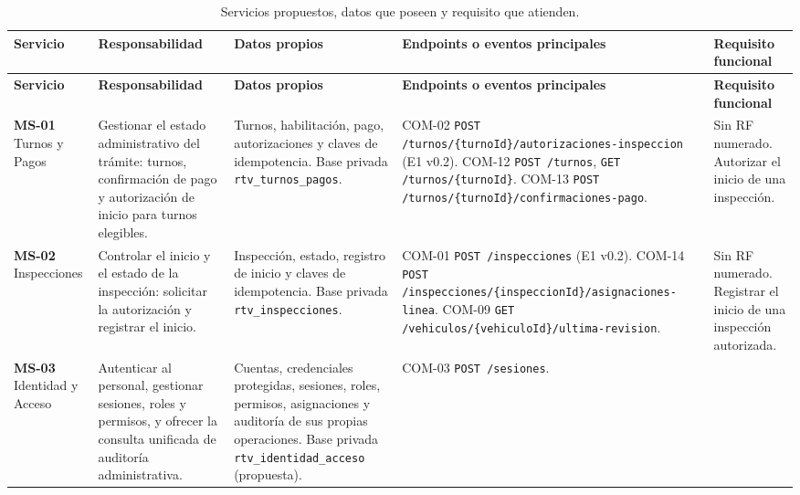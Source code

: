 \documentclass[11pt,a4paper]{article}
\begin{document}
\begingroup
\footnotesize
\renewcommand{\arraystretch}{1.05}
\begin{longtable}{@{}p{1.9cm}p{3.3cm}p{4.1cm}p{3.1cm}p{2.1cm}@{}}
\caption{Servicios propuestos, datos que poseen y requisito que atienden.}\label{tab:servicios}\\
\toprule
\textbf{Servicio} & \textbf{Responsabilidad} & \textbf{Datos propios} & \textbf{Endpoints o eventos principales} & \textbf{Requisito funcional}\\
\midrule
\endfirsthead
\toprule
\textbf{Servicio} & \textbf{Responsabilidad} & \textbf{Datos propios} & \textbf{Endpoints o eventos principales} & \textbf{Requisito funcional}\\
\midrule
\endhead
\bottomrule
\endfoot
\textbf{MS-01} Turnos y Pagos &
Gestionar el estado administrativo del trámite: turnos, confirmación de pago y autorización de inicio para turnos elegibles. &
Turnos, habilitación, pago, autorizaciones y claves de idempotencia. Base privada \texttt{rtv\_turnos\_pagos}. &
COM-02 \texttt{POST /turnos/\{turnoId\}/\allowbreak autorizaciones-\allowbreak inspeccion} (E1 v0.2).\newline
COM-12 \texttt{POST /turnos}, \texttt{GET /turnos/\{turnoId\}}.\newline
COM-13 \texttt{POST /turnos/\{turnoId\}/\allowbreak confirmaciones-\allowbreak pago}. &
Sin RF numerado. Autorizar el inicio de una inspección.\\
\addlinespace
\textbf{MS-02} Inspecciones &
Controlar el inicio y el estado de la inspección: solicitar la autorización y registrar el inicio. &
Inspección, estado, registro de inicio y claves de idempotencia. Base privada \texttt{rtv\_inspecciones}. &
COM-01 \texttt{POST /inspecciones} (E1 v0.2).\newline
COM-14 \texttt{POST /inspecciones/\allowbreak\{inspeccionId\}/\allowbreak asignaciones-\allowbreak linea}.\newline
COM-09 \texttt{GET /vehiculos/\allowbreak\{vehiculoId\}/\allowbreak ultima-revision}. &
Sin RF numerado. Registrar el inicio de una inspección autorizada.\\
\addlinespace
\textbf{MS-03} Identidad y Acceso &
Autenticar al personal, gestionar sesiones, roles y permisos, y ofrecer la consulta unificada de auditoría administrativa. &
Cuentas, credenciales protegidas, sesiones, roles, permisos, asignaciones y auditoría de sus propias operaciones. Base privada \texttt{rtv\_identidad\_acceso} (propuesta). &
COM-03 \texttt{POST /sesiones}.\newline

\end{longtable}
\end{document}
